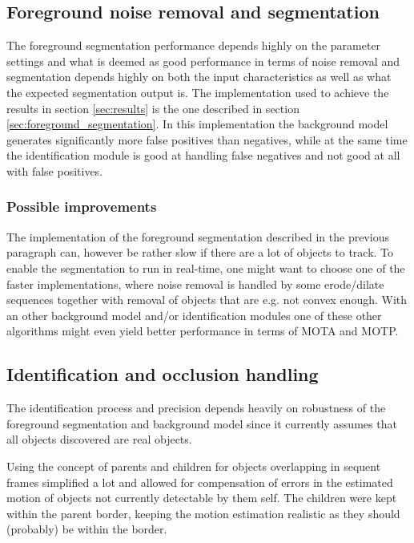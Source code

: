 \subsection{Foreground noise removal and segmentation}
The foreground segmentation performance depends highly on the parameter settings and what is deemed as good performance in terms of noise removal and segmentation depends highly on both the input characteristics as well as what the expected segmentation output is. The implementation used to achieve the results in section \ref{sec:results}  is the one  described in section \ref{sec:foreground_segmentation}. In this implementation the background model generates significantly more false positives than negatives, while at the same time the identification module is good at handling false negatives and not good at all with false positives. 

\subsubsection{Possible improvements}
The implementation of the foreground segmentation described in the previous paragraph can, however be rather slow if there are a lot of objects to track. To enable the segmentation to run in real-time, one might want to choose one of the faster implementations, where noise removal is handled by some erode/dilate sequences together with removal of objects that are e.g. not convex enough. With an other background model and/or identification modules one of these other algorithms might even yield better performance in terms of MOTA and MOTP.

\subsection{Identification and occlusion handling}
The identification process and precision depends heavily on robustness of the foreground segmentation and background model since it currently assumes that all objects discovered are real objects.

Using the concept of parents and children for objects overlapping in sequent frames simplified a lot and allowed for compensation of errors in the estimated motion of objects not currently detectable by them self. The children were kept within the parent border, keeping the motion estimation realistic as they should (probably) be within the border.


